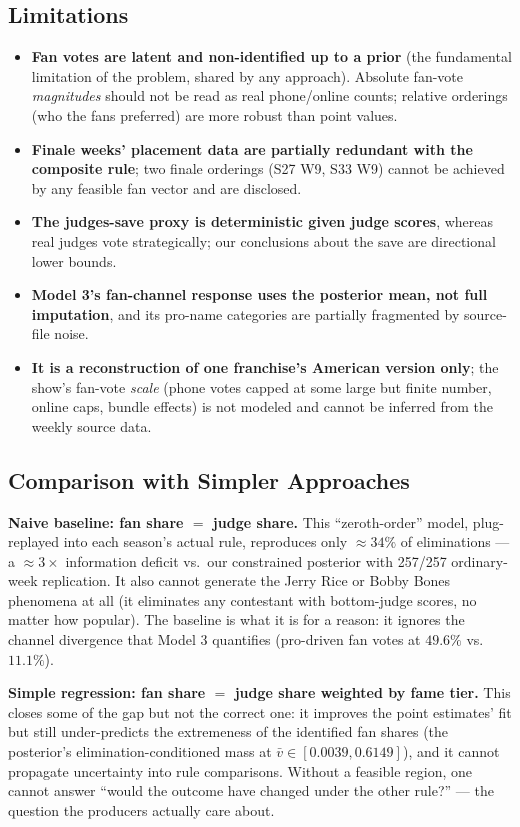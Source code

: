 \documentclass{article}
\begin{document}
\subsection{Limitations}

\begin{itemize}
  \item \textbf{Fan votes are latent and non-identified up to a prior} (the fundamental limitation of the problem, shared by any approach). Absolute fan-vote \emph{magnitudes} should not be read as real phone/online counts; relative orderings (who the fans preferred) are more robust than point values.
  \item \textbf{Finale weeks' placement data are partially redundant with the composite rule}; two finale orderings (S27 W9, S33 W9) cannot be achieved by any feasible fan vector and are disclosed.
  \item \textbf{The judges-save proxy is deterministic given judge scores}, whereas real judges vote strategically; our conclusions about the save are directional lower bounds.
  \item \textbf{Model 3's fan-channel response uses the posterior mean, not full imputation}, and its pro-name categories are partially fragmented by source-file noise.
  \item \textbf{It is a reconstruction of one franchise's American version only}; the show's fan-vote \emph{scale} (phone votes capped at some large but finite number, online caps, bundle effects) is not modeled and cannot be inferred from the weekly source data.
\end{itemize}

\subsection{Comparison with Simpler Approaches}

\textbf{Naive baseline: fan share $=$ judge share.} This ``zeroth-order'' model, plug-replayed into each season's actual rule, reproduces only $\approx 34\%$ of eliminations --- a $\approx 3\times$ information deficit vs.\ our constrained posterior with 257/257 ordinary-week replication. It also cannot generate the Jerry Rice or Bobby Bones phenomena at all (it eliminates any contestant with bottom-judge scores, no matter how popular). The baseline is what it is for a reason: it ignores the channel divergence that Model 3 quantifies (pro-driven fan votes at $49.6\%$ vs.\ $11.1\%$).

\textbf{Simple regression: fan share $=$ judge share weighted by fame tier.} This closes some of the gap but not the correct one: it improves the point estimates' fit but still under-predicts the extremeness of the identified fan shares (the posterior's elimination-conditioned mass at $\bar v \in [0.0039, 0.6149]$), and it cannot propagate uncertainty into rule comparisons. Without a feasible region, one cannot answer ``would the outcome have changed under the other rule?'' --- the question the producers actually care about.
\end{document}
